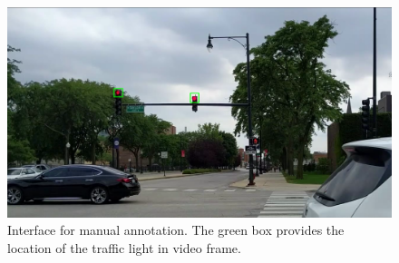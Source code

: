 \begin{figure}[!ht]
\centering
\includegraphics[width=5.2in]{images/annotation.png}
\caption{Interface for manual annotation. The green box provides the location of the traffic light in video frame.}
\label{f:annotate}
\end{figure}

